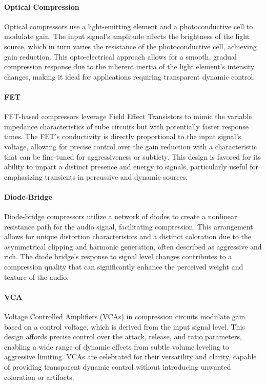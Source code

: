 \documentclass[10pt]{article}
\begin{document}
\begin{multicols*}{2}
                \paragraph{Optical Compression}
                    Optical compressors use a light-emitting element and a photoconductive cell to modulate gain. The input signal's amplitude affects the brightness of the light source, which in turn varies the resistance of the photoconductive cell, achieving gain reduction. This opto-electrical approach allows for a smooth, gradual compression response due to the inherent inertia of the light element's intensity changes, making it ideal for applications requiring transparent dynamic control.

                \paragraph{FET}
                    FET-based compressors leverage Field Effect Transistors to mimic the variable impedance characteristics of tube circuits but with potentially faster response times. The FET's conductivity is directly proportional to the input signal's voltage, allowing for precise control over the gain reduction with a characteristic that can be fine-tuned for aggressiveness or subtlety. This design is favored for its ability to impart a distinct presence and energy to signals, particularly useful for emphasizing transients in percussive and dynamic sources.
                
                \paragraph{Diode-Bridge}
                    Diode-bridge compressors utilize a network of diodes to create a nonlinear resistance path for the audio signal, facilitating compression. This arrangement allows for unique distortion characteristics and a distinct coloration due to the asymmetrical clipping and harmonic generation, often described as aggressive and rich. The diode bridge's response to signal level changes contributes to a compression quality that can significantly enhance the perceived weight and texture of the audio.

                \paragraph{VCA}
                    Voltage Controlled Amplifiers (VCAs) in compression circuits modulate gain based on a control voltage, which is derived from the input signal level. This design affords precise control over the attack, release, and ratio parameters, enabling a wide range of dynamic effects from subtle volume leveling to aggressive limiting. VCAs are celebrated for their versatility and clarity, capable of providing transparent dynamic control without introducing unwanted coloration or artifacts.  


\end{multicols*}
\end{document}
